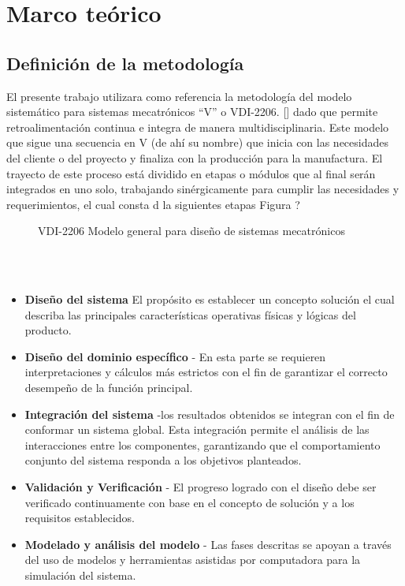\section{Marco teórico}


\subsection{Definición de la metodología}

El presente trabajo utilizara como referencia la metodología del modelo sistemático para sistemas mecatrónicos ``V'' o  VDI-2206. [\cite{gausemeier2003new}] dado que permite retroalimentación continua e integra de manera multidisciplinaria. Este modelo que sigue una secuencia en V (de ahí su nombre) que inicia con las necesidades del cliente o del proyecto y finaliza con la producción para la manufactura. El trayecto de este proceso está dividido en etapas o módulos que al final serán integrados en uno solo, trabajando sinérgicamente para cumplir las necesidades y requerimientos, el cual consta d la siguientes etapas Figura ?  \\


\begin{figure}[h]
\centering
\caption{VDI-2206 Modelo general para diseño de sistemas mecatrónicos}
\end{figure}\\
\\

\begin{itemize}
    \item \textbf{Diseño del sistema} El propósito es establecer un concepto solución el cual describa las principales características operativas físicas y lógicas del producto. %
    \item \textbf{Diseño del dominio específico} - En esta parte se requieren interpretaciones y cálculos más estrictos con el fin de garantizar el correcto desempeño de la función principal.
    \item \textbf{Integración del sistema} -los resultados obtenidos  se integran con el fin de conformar un sistema global. Esta integración permite el análisis de las interacciones entre los componentes, garantizando que el comportamiento conjunto del sistema responda a los objetivos planteados.
    \item \textbf{Validación y Verificación} - El progreso logrado con el diseño debe ser verificado continuamente con base en el concepto de solución  y a los requisitos establecidos.
    \item \textbf{Modelado y análisis del modelo} - Las fases descritas se apoyan a través del uso de modelos y herramientas asistidas por computadora para la simulación del sistema.
\end{itemize}
